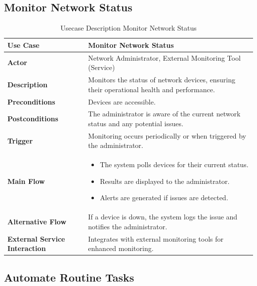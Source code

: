 \subsection{Monitor Network Status}


\begin{table}[H]
    \centering
    \caption{Usecase Description Monitor Network Status}
    \renewcommand{\arraystretch}{1.3}
    \begin{tabular}{|p{3cm}|p{11cm}|}
        \hline
        \textbf{Use Case} & \textbf{Monitor Network Status} \\
        \hline
        \textbf{Actor} & Network Administrator, External Monitoring Tool (Service) \\
        \hline
        \textbf{Description} & Monitors the status of network devices, ensuring their operational health and performance. \\
        \hline
        \textbf{Preconditions} & Devices are accessible. \\
        \hline
        \textbf{Postconditions} & The administrator is aware of the current network status and any potential issues. \\
        \hline
        \textbf{Trigger} & Monitoring occurs periodically or when triggered by the administrator. \\
        \hline
        \textbf{Main Flow} & 
        \begin{itemize}
            \item The system polls devices for their current status.
            \item Results are displayed to the administrator.
            \item Alerts are generated if issues are detected.
        \end{itemize} \\
        \hline
        \textbf{Alternative Flow} & If a device is down, the system logs the issue and notifies the administrator. \\
        \hline
        \textbf{External Service Interaction} & Integrates with external monitoring tools for enhanced monitoring. \\
        \hline
    \end{tabular}
\end{table}

\subsection{Automate Routine Tasks}


